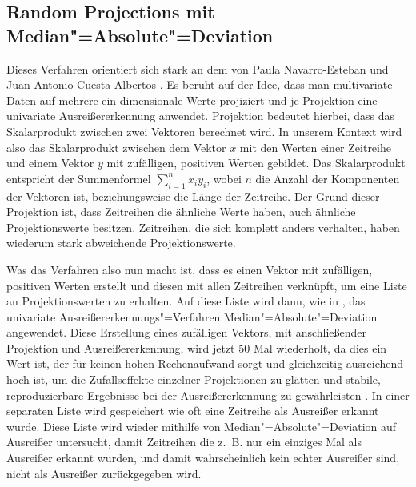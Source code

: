 \subsection{Random Projections mit Median"=Absolute"=Deviation}
Dieses Verfahren orientiert sich stark an dem von Paula Navarro-Esteban und Juan Antonio Cuesta-Albertos \cite{randomProjection}. Es beruht auf der Idee, dass man multivariate Daten auf mehrere ein-dimensionale Werte projiziert und je Projektion eine univariate Ausreißererkennung anwendet. Projektion bedeutet hierbei, dass das Skalarprodukt zwischen zwei Vektoren berechnet wird. In unserem Kontext wird also das Skalarprodukt zwischen dem Vektor $x$ mit den Werten einer Zeitreihe und einem Vektor $y$ mit zufälligen, positiven Werten gebildet. Das Skalarprodukt entspricht der Summenformel $\sum_{i=1}^{n}x_iy_i$, wobei $n$ die Anzahl der Komponenten der Vektoren ist, beziehungsweise die Länge der Zeitreihe. Der Grund dieser Projektion ist, dass Zeitreihen die ähnliche Werte haben, auch ähnliche Projektionswerte besitzen, Zeitreihen, die sich komplett anders verhalten, haben wiederum stark abweichende Projektionswerte. 

Was das Verfahren also nun macht ist, dass es einen Vektor mit zufälligen, positiven Werten erstellt und diesen mit allen Zeitreihen verknüpft, um eine Liste an Projektionswerten zu erhalten. Auf diese Liste wird dann, wie in \cite[Ch. 3.3]{randomProjection}, das univariate Ausreißererkennungs"=Verfahren Median"=Absolute"=Deviation angewendet. Diese Erstellung eines zufälligen Vektors, mit anschließender Projektion und Ausreißererkennung, wird jetzt 50 Mal wiederholt, da dies ein Wert ist, der für keinen hohen Rechenaufwand sorgt und gleichzeitig ausreichend hoch ist, um die Zufallseffekte einzelner Projektionen zu glätten und stabile, reproduzierbare Ergebnisse bei der Ausreißererkennung zu gewährleisten \cite[Ch. 4.1]{randomProjection}. In einer separaten Liste wird gespeichert wie oft eine Zeitreihe als Ausreißer erkannt wurde. Diese Liste wird wieder mithilfe von Median"=Absolute"=Deviation auf Ausreißer untersucht, damit Zeitreihen die z.~B. nur ein einziges Mal als Ausreißer erkannt wurden, und damit wahrscheinlich kein echter Ausreißer sind, nicht als Ausreißer zurückgegeben wird.


